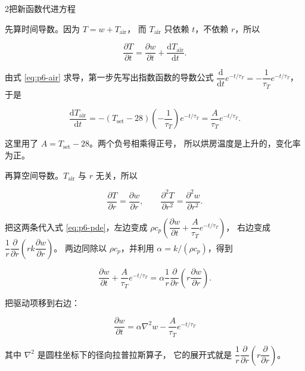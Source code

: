 \begin{stepbox}{2}{把新函数代进方程}

先算时间导数。因为 $T=w+T_{\mathrm{air}}$，
而 $T_{\mathrm{air}}$ 只依赖 $t$，不依赖 $r$，所以

\begin{equation}
\frac{\partial T}{\partial t}
=\frac{\partial w}{\partial t}+\frac{\mathrm{d}T_{\mathrm{air}}}{\mathrm{d}t}.
\end{equation}

由式 \eqref{eq:p6-air} 求导，第一步先写出指数函数的导数公式
$\dfrac{\mathrm{d}}{\mathrm{d}t}e^{-t/\tau_T}=-\dfrac{1}{\tau_T}e^{-t/\tau_T}$，
于是

\begin{equation}
\frac{\mathrm{d}T_{\mathrm{air}}}{\mathrm{d}t}
=-\left(T_{\mathrm{set}}-28\right)\left(-\frac{1}{\tau_T}\right)e^{-t/\tau_T}
=\frac{A}{\tau_T}e^{-t/\tau_T}.
\end{equation}

这里用了 $A=T_{\mathrm{set}}-28$。两个负号相乘得正号，
所以烘房温度是上升的，变化率为正。

再算空间导数。$T_{\mathrm{air}}$ 与 $r$ 无关，所以

\begin{equation}
\frac{\partial T}{\partial r}=\frac{\partial w}{\partial r},
\qquad
\frac{\partial^2 T}{\partial r^2}=\frac{\partial^2 w}{\partial r^2}.
\end{equation}

把这两条代入式 \eqref{eq:p6-pde}，左边变成
$\rho c_p\left(\dfrac{\partial w}{\partial t}+\dfrac{A}{\tau_T}e^{-t/\tau_T}\right)$，
右边变成 $\dfrac{1}{r}\dfrac{\partial}{\partial r}\left(r k\dfrac{\partial w}{\partial r}\right)$。
两边同除以 $\rho c_p$，并利用 $\alpha=k/(\rho c_p)$，得到

\begin{equation}
\frac{\partial w}{\partial t}+\frac{A}{\tau_T}e^{-t/\tau_T}
=\alpha\frac{1}{r}\frac{\partial}{\partial r}\left(r\frac{\partial w}{\partial r}\right).
\end{equation}

把驱动项移到右边：

\begin{equation}
\boxed{\ \frac{\partial w}{\partial t}
=\alpha\nabla^2 w-\frac{A}{\tau_T}e^{-t/\tau_T}\ }
\label{eq:p6-wpde}
\end{equation}

其中 $\nabla^2$ 是圆柱坐标下的径向拉普拉斯算子，
它的展开式就是 $\dfrac{1}{r}\dfrac{\partial}{\partial r}\left(r\dfrac{\partial}{\partial r}\right)$。

\end{stepbox}

